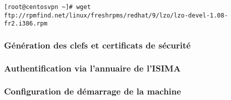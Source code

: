 \verb|[root@centosvpn ~]# wget ftp://rpmfind.net/linux/freshrpms/redhat/9/lzo/lzo-devel-1.08-fr2.i386.rpm|

\subsubsection{Génération des clefs et certificats de sécurité}

\subsubsection{Authentification via l'annuaire de l'ISIMA}

\subsubsection{Configuration de démarrage de la machine}

\pagebreak


% 
